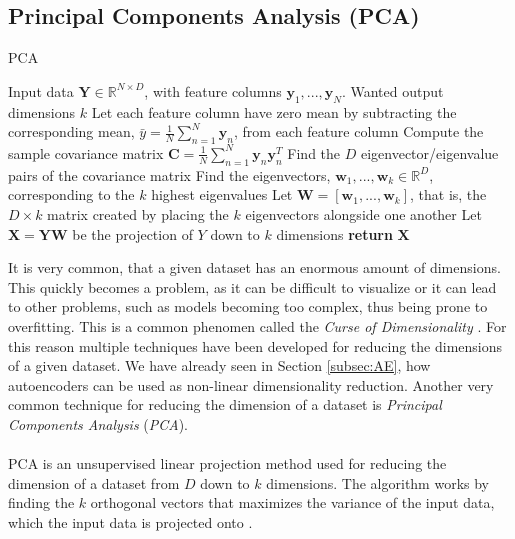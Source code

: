 \documentclass[./main.tex]{subfiles}
\begin{document}
\subsection{Principal Components Analysis (PCA)}\label{subsec:PCA}
\begin{algorithm}[htbp]
    \caption{PCA \cite{MAD_book}}
    \begin{algorithmic}[1]
        \Require Input data $\bm{Y} \in \mathbb{R}^{N \times D}$, with feature columns $\bm{y}_1, ..., \bm{y}_N$.
        \Require Wanted output dimensions $k$
        \State Let each feature column have zero mean by subtracting the corresponding mean, $\bar{y} = \frac{1}{N} \sum_{n = 1} ^N \bm{y}_n$, from each feature column
        \State Compute the sample covariance matrix $\bm{C} = \frac{1}{N} \sum_{n = 1} ^N \bm{y}_n \bm{y}_n ^T$ 
        \State Find the $D$ eigenvector/eigenvalue pairs of the covariance matrix
        \State Find the eigenvectors, $\bm{w}_1, ..., \bm{w}_k \in \mathbb{R}^D$, corresponding to the $k$ highest eigenvalues
        \State Let $\bm{W} = \left[ \bm{w}_1, ..., \bm{w}_k \right]$, that is, the $D \times k$ matrix created by placing the $k$ eigenvectors alongside one another
        \State Let $\bm{X} = \bm{Y} \bm{W}$ be the projection of $Y$ down to $k$ dimensions
        \State \textbf{return} $\bm{X}$
    \end{algorithmic}
    \label{Algorithm:PCA}
\end{algorithm}
\noindent It is very common, that a given dataset has an enormous amount of dimensions. This quickly becomes a problem, as it can be difficult to visualize or it can lead to other problems, such as models becoming too complex, thus being prone to overfitting. This is a common phenomen called the \textit{Curse of Dimensionality} \cite{ESL}. For this reason multiple techniques have been developed for reducing the dimensions of a given dataset. We have already seen in Section \ref{subsec:AE}, how autoencoders can be used as non-linear dimensionality reduction. Another very common technique for reducing the dimension of a dataset is \textit{Principal Components Analysis} (\textit{PCA}).
\\
\\
PCA is an unsupervised linear projection method used for reducing the dimension of a dataset from $D$ down to $k$ dimensions. The algorithm works by finding the $k$ orthogonal vectors that maximizes the variance of the input data, which the input data is projected onto \cite{MAD_book}.
\\
\\
\end{document}
